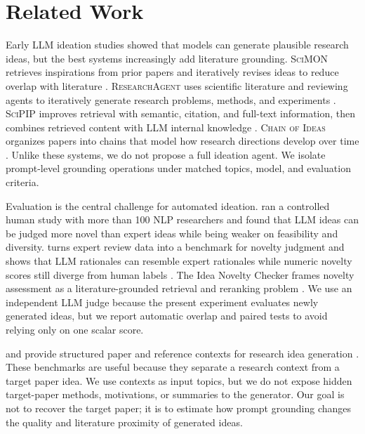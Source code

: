 \section{Related Work}
\label{sec:related_work}

 Early LLM ideation studies showed that models can generate plausible research ideas, but the best systems increasingly add literature grounding. \textsc{SciMON} retrieves inspirations from prior papers and iteratively revises ideas to reduce overlap with literature \citep{wang2024scimon}. \textsc{ResearchAgent} uses scientific literature and reviewing agents to iteratively generate research problems, methods, and experiments \citep{baek2024researchagent}. \textsc{SciPIP} improves retrieval with semantic, citation, and full-text information, then combines retrieved content with LLM internal knowledge \citep{wang2024scipip}. \textsc{Chain of Ideas} organizes papers into chains that model how research directions develop over time \citep{li2024chain}. Unlike these systems, we do not propose a full ideation agent. We isolate prompt-level grounding operations under matched topics, model, and evaluation criteria.

 Evaluation is the central challenge for automated ideation. \citet{si2024llms} ran a controlled human study with more than 100 NLP researchers and found that LLM ideas can be judged more novel than expert ideas while being weaker on feasibility and diversity. \rinobench turns expert review data into a benchmark for novelty judgment and shows that LLM rationales can resemble expert rationales while numeric novelty scores still diverge from human labels \citep{schopf2026rinobench}. The Idea Novelty Checker frames novelty assessment as a literature-grounded retrieval and reranking problem \citep{shahid2025literature}. We use an independent LLM judge because the present experiment evaluates newly generated ideas, but we report automatic overlap and paired tests to avoid relying only on one scalar score.

 \ideabench and \aibidea provide structured paper and reference contexts for research idea generation \citep{guo2024ideabench,qiu2025aiideabench}. These benchmarks are useful because they separate a research context from a target paper idea. We use \aibidea contexts as input topics, but we do not expose hidden target-paper methods, motivations, or summaries to the generator. Our goal is not to recover the target paper; it is to estimate how prompt grounding changes the quality and literature proximity of generated ideas.

